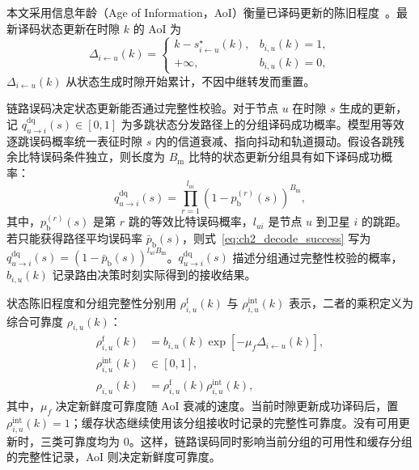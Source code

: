 本文采用信息年龄（Age of Information，AoI）衡量已译码更新的陈旧程度~\cite{Yates-AoI-JSAC21}。最新译码状态更新在时隙 $k$ 的 AoI 为
\begin{equation}
\Delta_{i\leftarrow u}(k)
=
\begin{cases}
k-s_{i\leftarrow u}^{\star}(k), & b_{i,u}(k)=1,\\
+\infty, & b_{i,u}(k)=0,
\end{cases}
\label{eq:ch2_aoi}
\end{equation}
$\Delta_{i\leftarrow u}(k)$ 从状态生成时隙开始累计，不因中继转发而重置。

链路误码决定状态更新能否通过完整性校验。对于节点 $u$ 在时隙 $s$ 生成的更新，记 $q_{u\rightarrow i}^{\mathrm{dq}}(s)\in[0,1]$ 为多跳状态分发路径上的分组译码成功概率。模型用等效逐跳误码概率统一表征时隙 $s$ 内的信道衰减、指向抖动和轨道摄动。假设各跳残余比特误码条件独立，则长度为 $B_{\mathrm m}$ 比特的状态更新分组具有如下译码成功概率：
\begin{equation}
q_{u\rightarrow i}^{\mathrm{dq}}(s)
=
\prod_{r=1}^{l_{ui}}
\left(1-p_{\mathrm b}^{(r)}(s)\right)^{B_{\mathrm m}},
\label{eq:ch2_decode_success}
\end{equation}
其中，$p_{\mathrm b}^{(r)}(s)$ 是第 $r$ 跳的等效比特误码概率，$l_{ui}$ 是节点 $u$ 到卫星 $i$ 的跳距。若只能获得路径平均误码率 $\bar p_{\mathrm b}(s)$，则式~\eqref{eq:ch2_decode_success} 写为 $q_{u\rightarrow i}^{\mathrm{dq}}(s)=(1-\bar p_{\mathrm b}(s))^{l_{ui}B_{\mathrm m}}$。$q_{u\rightarrow i}^{\mathrm{dq}}(s)$ 描述分组通过完整性校验的概率，$b_{i,u}(k)$ 记录路由决策时刻实际得到的接收结果。

状态陈旧程度和分组完整性分别用 $\rho_{i,u}^{\mathrm f}(k)$ 与 $\rho_{i,u}^{\mathrm{int}}(k)$ 表示，二者的乘积定义为综合可靠度 $\rho_{i,u}(k)$：
\begin{equation}
\begin{aligned}
\rho_{i,u}^{\mathrm f}(k)
&=b_{i,u}(k)\exp\!\left[-\mu_f\Delta_{i\leftarrow u}(k)\right],\\
\rho_{i,u}^{\mathrm{int}}(k)
&\in[0,1],\\
\rho_{i,u}(k)
&=\rho_{i,u}^{\mathrm f}(k)\rho_{i,u}^{\mathrm{int}}(k),
\end{aligned}
\label{eq:ch2_overall_reliability}
\end{equation}
其中，$\mu_f$ 决定新鲜度可靠度随 AoI 衰减的速度。当前时隙更新成功译码后，置 $\rho_{i,u}^{\mathrm{int}}(k)=1$；缓存状态继续使用该分组接收时记录的完整性可靠度。没有可用更新时，三类可靠度均为 $0$。这样，链路误码同时影响当前分组的可用性和缓存分组的完整性记录，AoI 则决定新鲜度可靠度。

